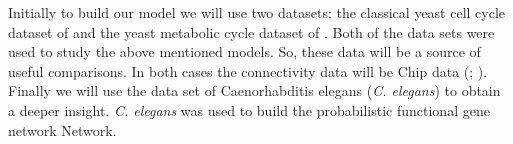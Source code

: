 Initially to build our model we will use two datasets: the classical yeast cell cycle dataset of 
\cite{Spellman:1998} and the yeast metabolic cycle dataset of \cite{Tu:2005}. Both of the data 
sets were used to study the above mentioned models. So, these data will be a source of useful comparisons. 
In both cases the connectivity data will be Chip data (\cite{Lee:2002}; \cite{Harbison:2004}). 
Finally we will use the data set of Caenorhabditis elegans (\textit{C. elegans}) to obtain a deeper insight. 
\textit{C. elegans} was used to build the probabilistic functional gene network Network.


